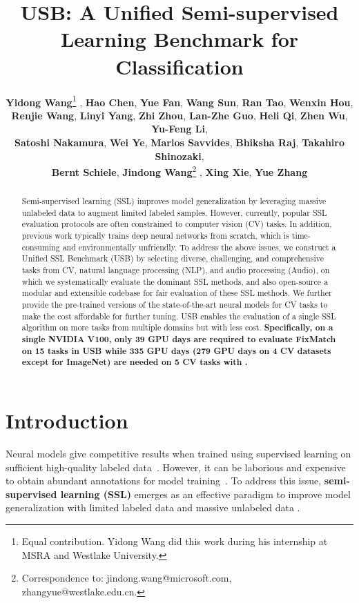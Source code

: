 \documentclass{article}
\title{USB: A Unified Semi-supervised Learning Benchmark for Classification}
\author{\textbf{Yidong Wang}\thanks{Equal contribution. Yidong Wang did this work during his internship at MSRA and Westlake University.} , \textbf{Hao Chen}, \textbf{Yue Fan}, \textbf{Wang Sun}, \textbf{Ran Tao}, \textbf{Wenxin Hou},\\ \textbf{Renjie Wang}, \textbf{Linyi Yang}, \textbf{Zhi Zhou}, \textbf{Lan-Zhe Guo}, \textbf{Heli Qi}, \textbf{Zhen Wu}, \textbf{Yu-Feng Li},\\
  \textbf{Satoshi Nakamura},
  \textbf{Wei Ye},
  \textbf{Marios Savvides}, \textbf{Bhiksha Raj}, \textbf{Takahiro Shinozaki},\\ \textbf{Bernt Schiele}, \textbf{Jindong Wang}\thanks{Correspondence to: jindong.wang@microsoft.com, zhangyue@westlake.edu.cn.} , \textbf{Xing Xie},  \textbf{Yue Zhang}
}
\affil{\small{Microsoft Research Asia, Westlake University, Tokyo Institute of Technology,\\ Carnegie Mellon University, Max-Planck-Institut für Informatik, Tsinghua University,\\ Microsoft STCA, Nanjing University, Nara Institute of Science and Technology, Peking University}
}
\newcommand{\datasetnum}{\xspace}
\newcommand{\revision}[1]{{\color{black}{#1}}}
\begin{document}
\maketitle


\begin{abstract}


Semi-supervised learning (SSL) improves model generalization by leveraging massive unlabeled data to augment limited labeled samples. However, currently, popular SSL evaluation protocols are often constrained to computer vision (CV) tasks. In addition, previous work typically trains deep neural networks from scratch, which is time-consuming and environmentally unfriendly. To address the above issues, we construct a Unified SSL Benchmark (USB) \revision{for classification} by selecting \datasetnum diverse, challenging, and comprehensive tasks from CV, natural language processing (NLP), and audio processing (Audio), on which we systematically evaluate the dominant SSL methods, and also open-source a modular and extensible codebase for fair evaluation of these SSL methods. We further provide the pre-trained versions of the state-of-the-art neural models for CV tasks to make the cost affordable for further tuning. USB enables the evaluation of a single SSL algorithm on more tasks from multiple domains but with less cost. \textbf{Specifically, on a single NVIDIA V100, only 39 GPU days are required to evaluate FixMatch on 15 tasks in USB while 335 GPU days (279 GPU days on 4 CV datasets except for ImageNet) are needed on 5 CV tasks with \revision{TorchSSL}.}


\end{abstract}

\section{Introduction}

Neural models give competitive results when trained using supervised learning on sufficient high-quality labeled data~\cite{he2016deep,redmon2016you,hochreiter1997long,vaswani2017attention,yu2016automatic,gulati2020conformer,verma2021graphmix}.
However, it can be laborious and expensive to obtain abundant annotations for model training~\cite{ILSVRC15,wang2019glue}.
To address this issue, \textbf{semi-supervised learning (SSL)} emerges as an effective paradigm to improve model generalization with limited labeled data and massive unlabeled data \cite{reddy2018semi,zhu2005semi,zhu2009introduction,van2020survey,ouali2020overview,qi2020small}.
\end{document}
